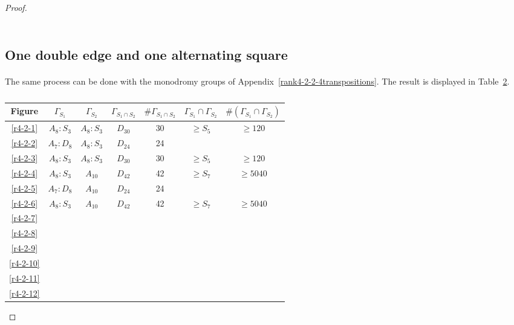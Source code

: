 \begin{proof}
\begin{table}
\begin{tabular}{|c|c|c|c|c|c|c|}
  \end{tabular}
  \caption{}
  \label{results-2-1}
\end{table}

\subsection{One double edge and one alternating square}

  \paragraph{}
  The same process can be done with the monodromy groups of Appendix~\ref{rank4-2-2-4transpositions}. The result is displayed in Table~\ref{results-2-2}.

  \begin{table}
    \centering
    \begin{tabular}{|c|c|c|c|c|c|c|}
      \hline
      Figure & $\Gamma_{S_1}$ & $\Gamma_{S_2}$ & $\Gamma_{S_1 \cap S_2}$ & $\#\Gamma_{S_1 \cap S_2}$ & $\Gamma_{S_1} \cap \Gamma_{S_2}$ & $\#(\Gamma_{S_1} \cap \Gamma_{S_2})$ \\ \hline

      \ref{r4-2-1} & $A_8 : S_3$ & $A_8 : S_3 $ & $D_{30}$ & 30 & $\ge S_5$ & $\ge 120$ \\ \hline
      \ref{r4-2-2} & $A_7 : D_8$ & $A_8 : S_3$ & $D_{24}$ & 24 & & \\ \hline
      \ref{r4-2-3} & $A_8 : S_3$ & $A_8 : S_3 $ & $D_{30}$ & 30 & $\ge S_5$ & $\ge 120$ \\ \hline
      \ref{r4-2-4} & $A_8 : S_3$ & $A_{10}$ & $D_{42}$ & 42 & $\ge S_7$ & $\ge 5040$ \\ \hline
      \ref{r4-2-5} & $A_7 : D_8$ & $A_{10}$ & $D_{24}$ & 24 & & \\ \hline
      \ref{r4-2-6} & $A_8 : S_3$ & $A_{10}$ & $D_{42}$ & 42 & $\ge S_7$ & $\ge 5040$ \\ \hline
      \ref{r4-2-7} & \\ \hline
      \ref{r4-2-8} & \\ \hline
      \ref{r4-2-9} & \\ \hline
      \ref{r4-2-10} & \\ \hline
      \ref{r4-2-11} & \\ \hline
      \ref{r4-2-12} & \\ \hline
        \end{tabular}
    \caption{}
    \label{results-2-2}
  \end{table}


\end{proof}
